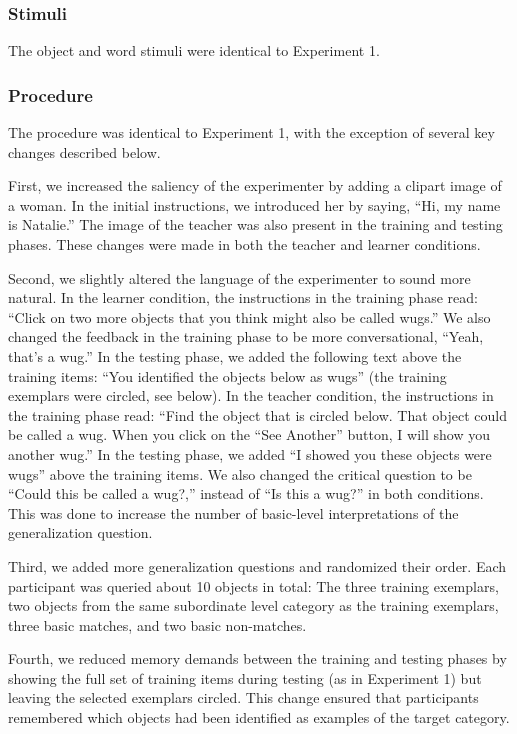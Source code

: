 \documentclass[man]{apa2}
\begin{document}
\subsubsection{Stimuli}
The object and word stimuli were identical to Experiment 1.

\subsubsection{Procedure}
The procedure was identical to Experiment 1, with the exception of several key changes described below.

First, we increased the saliency of the experimenter by adding a clipart image of a woman. In the initial instructions, we introduced her by saying, ``Hi, my name is Natalie.'' The image of the teacher was also present in the training and testing phases. These changes were made in both the teacher and learner conditions.

Second, we slightly altered the language of the experimenter to sound more natural. In the learner condition, the instructions in the training phase read: ``Click on two more objects that you think might also be called wugs.'' We also changed the feedback in the training phase to be more conversational, ``Yeah, that's a wug.'' In the testing phase, we added the following text above the training items: ``You identified the objects below as wugs'' (the training exemplars were circled, see below). In the teacher condition, the instructions in the training phase read: ``Find the object that is circled below. That object could be called a wug. When you click on the ``See Another'' button, I will show you another wug.'' In the testing phase, we added ``I showed you these objects were wugs'' above the training items. We also changed the critical question to be ``Could this be called a wug?,'' instead of ``Is this a wug?'' in both conditions. This was done to increase the number of basic-level interpretations of the generalization question. 

Third, we added more generalization questions and randomized their order. Each participant was queried about 10 objects in total: The three training exemplars, two objects from the same subordinate level category as the training exemplars, three basic matches, and two basic non-matches. 

Fourth, we reduced memory demands between the training and testing phases by showing the full set of training items during testing (as in Experiment 1) but leaving the selected exemplars circled. This change ensured that participants remembered which objects had been identified as examples of the target category. 
\end{document}
